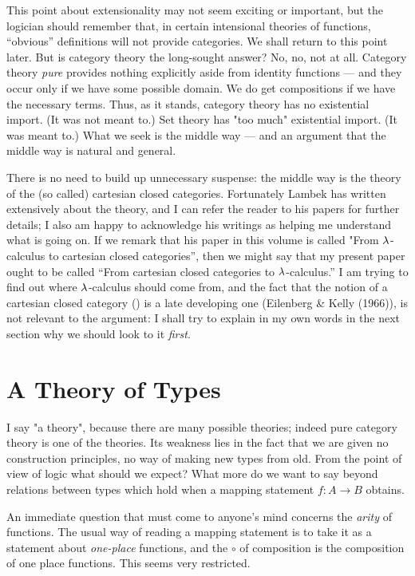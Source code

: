 This point about extensionality may not seem exciting or im­portant, but the logician should remember that, in certain intensional theories of functions, ``obvious'' definitions will not provide categories. We shall return to this point later. But is category theory the long-sought answer? No, no, not at all. Category theory {\it pure} provides nothing explicitly aside from identity functions --- and they occur only if we have some possible domain. We do get compositions if we have the neces­sary terms. Thus, as it stands, category theory has no existential import. (It was not meant to.) Set theory has "too much" existential import. (It was meant to.) What we seek is the middle way --- and an argument that the middle way is natural and general.

There is no need to build up unnecessary suspense: the middle way is the theory of the (so called) cartesian closed categories.
Fortunately Lambek has written extensively about the theory, and I can refer the reader to his papers for fur­ther details; I also am happy to acknowledge his writings as helping me understand what is going on. If we remark that his paper in this volume is called "From $\lambda$-calculus to cartesian closed categories'', then we might say that my present paper ought to be called ``From cartesian closed categories to $\lambda$-calculus.''
I am trying to find out where $\lambda$-calculus should come from, and the fact that the notion of a cartesian closed category (\ccc) is a late developing one (Eilenberg \& Kelly (1966)), is not relevant to the argument: I shall try to explain in my own words in the next section why we should look to it {\it first}.

\section{A Theory of Types}

I say "a theory", because there are many possible theories; indeed pure category theory is one of the theories.
Its weak­ness lies in the fact that we are given no construction principles, no way of making new types from old. From the point of view of logic what should we expect? What more do we want to say beyond relations between types which hold when a mapping statement $f : A\to	B$ obtains.

An immediate question that must come to anyone's mind con­cerns the {\it arity} of functions. The usual way of reading a map­ping statement is to take it as a statement about {\it one-place} functions, and the $\circ$ of composition is the composition of one­ place functions. This seems very restricted.

